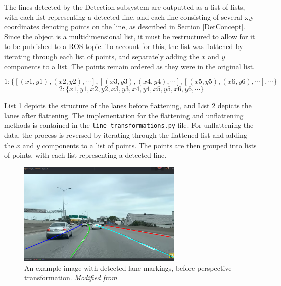 \documentclass[titlepage, draft]{article}
\begin{document}
{The lines detected by the Detection subsystem are outputted as a list of lists, with each list representing a detected line, and each line consisting of several x,y coordinates denoting points on the line, as described in Section \ref{DetConcept}. Since the object is a multidimensional list, it must be restructured to allow for it to be published to a ROS topic. To account for this, the list was flattened by iterating through each list of points, and separately adding the $x$ and $y$ components to a list. The points remain ordered as they were in the original list.

\[ 1: \{[(x1, y1), (x2, y2), \cdots], [(x3, y3), (x4, y4), \cdots ], [(x5, y5), (x6, y6), \cdots], \cdots \} \]
\[ 2: \{x1, y1, x2, y2, x3, y3, x4, y4, x5, y5, x6, y6, \cdots\} \]

List 1 depicts the structure of the lanes before flattening, and List 2 depicts the lanes after flattening. The implementation for the flattening and unflattening methods is contained in the \texttt{line\_transformations.py} file. For unflattening the data, the process is reversed by iterating through the flattened list and adding the $x$ and $y$ components to a list of points. The points are then grouped into lists of points, with each list representing a detected line.

\begin{figure}
	\centering
	\includegraphics[width=0.7\textwidth]{ikea_lines.png}
	\caption{An example image with detected lane markings, before perspective transformation.  \textit{Modified from} \cite{ikea_image}}
	\label{ikea_lines}
\end{figure}

}
\end{document}
